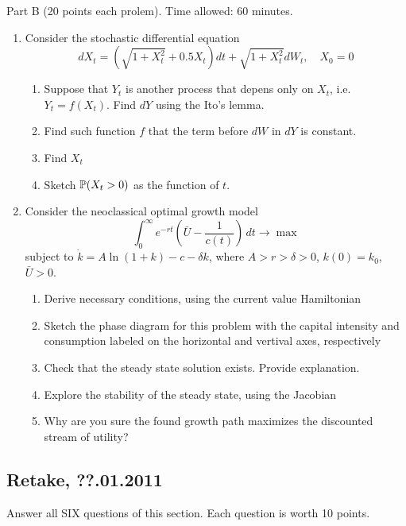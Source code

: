 \documentclass[pdftex,12pt,a4paper]{article}
\begin{document}
Part B (20 points each prolem). Time allowed: 60 minutes.  \\

\begin{enumerate}
\item Consider the stochastic differential equation 
\begin{equation}
dX_t=(\sqrt{1+X_t^2}+0.5X_t)dt+\sqrt{1+X_t^2}dW_t,\quad X_0=0 \nonumber
\end{equation}
\begin{enumerate}
\item Suppose that $Y_t$ is another process that depens only on $X_t$, i.e. $Y_t=f(X_t)$. Find $dY$ using the Ito's lemma.
\item Find such function $f$ that the term before $dW$ in $dY$ is constant.
\item Find $X_t$
\item Sketch $\P(X_t>0)$ as the function of $t$.
\end{enumerate}

\item Consider the neoclassical optimal growth model
\begin{equation}
\int_0^{\infty}e^{-rt}\left( \bar{U}-\frac{1}{c(t)}\right)\,dt \to \max \nonumber
\end{equation}
subject to $\dot{k}=A\ln(1+k)-c-\delta k$, where $A>r>\delta>0$, $k(0)=k_0$, $\bar{U}>0$.
\begin{enumerate}
\item Derive necessary conditions, using the current value Hamiltonian
\item Sketch the phase diagram for this problem with the capital intensity and consumption labeled on the horizontal and vertival axes, respectively
\item Check that the steady state solution exists. Provide explanation.
\item Explore the stability of the steady state, using the Jacobian
\item Why are you sure the found growth path maximizes the discounted stream of utility?
\end{enumerate}
\end{enumerate}

\subsection{Retake, ??.01.2011}

Answer all SIX questions of this section. Each question is worth 10 points.
\end{document}
